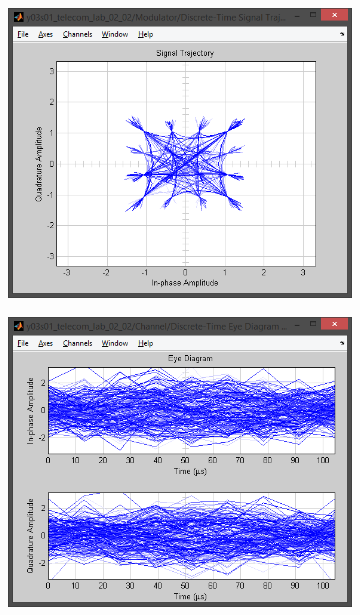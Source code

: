 \documentclass[
	a4paper,
	oneside,
	BCOR = 10mm,
	DIV = 12,
	12pt,
	headings = normal,
]{scrartcl}
\begin{document}
\begin{figure}[!htbp]
\begin{subfigure}{\textwidth / 3}
						\caption{}
						\label{subfig:rolloff-0p0-signal-trajectory-in}
					\end{subfigure}%
					\begin{subfigure}{\textwidth / 3}
						\centering
						\includegraphics[height = 7\baselineskip]{../01-solution/00-SNR-100db-noshift-modulator-signal-trajectory.png}
						\caption{}
						\label{subfig:rolloff-0p0-scatter-plot-in}
					\end{subfigure}
					\begin{subfigure}{\textwidth / 3}
						\centering
						\includegraphics[height = 7\baselineskip]{../01-solution/01-SNR-00-db-channel-eye-diagram.png}

\end{subfigure}
\end{figure}
\end{document}
